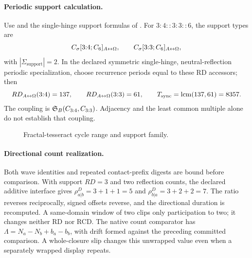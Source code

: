 \paragraph{Periodic support calculation.}
Use  and the single-hinge
support formulas of .
For \(3{:}4::3{:}3::6\), the support types are
\[
C_\sigma[3{:}4;C_6]_{A{\leftrightarrow}\Omega},
\qquad
C_\sigma[3{:}3;C_6]_{A{\leftrightarrow}\Omega},
\]
with \(|\Sigma_{\mathrm{support}}|=2\). In the declared symmetric single-hinge, neutral-reflection periodic specialization, choose recurrence periods equal to these RD accessors; then
\[
RD_{A{\leftrightarrow}\Omega}(3{:}4)=137,
\qquad
RD_{A{\leftrightarrow}\Omega}(3{:}3)=61,
\qquad
T_{\mathrm{sync}}=\operatorname{lcm}(137,61)=8357.
\]
The coupling is \(\mathfrak S_B(C_{3{:}4},C_{3{:}3})\). Adjacency and the
least common multiple alone do not establish that coupling.

\begin{figure}[H]
\centering
{}
\caption{Fractal-tesseract cycle range and support family.}
\label{fig:fractal-tesseract-beat-family}
\end{figure}

\paragraph{Directional count realization.}
Both wave identities and repeated contact-prefix digests are bound before
comparison. With support \(RD=3\) and two reflection counts, the declared
additive interface gives \(\rho^D_{a|b}=3+1+1=5\) and
\(\rho^D_{b|a}=3+2+2=7\). The ratio reverses reciprocally, signed offsets
reverse, and the directional duration is recomputed. A same-domain window of
two clips only participation to two; it changes neither RD nor RCD.
The native count comparator has \(\Lambda=N_a-N_b+b_a-b_b\), with drift
formed against the preceding committed comparison. A whole-closure slip
changes this unwrapped value even when a separately wrapped display repeats.

